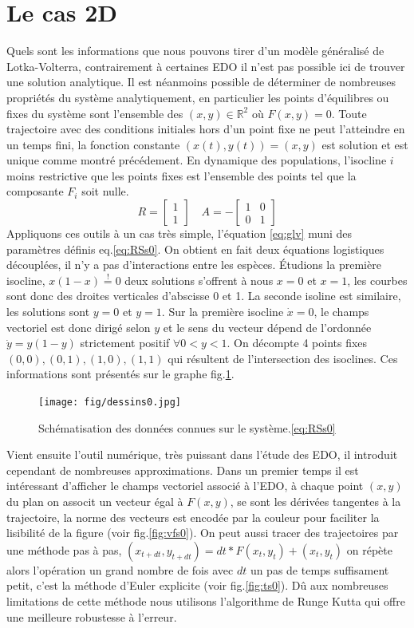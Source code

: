 \documentclass{wsdcr}
\begin{document}
\section{Le cas 2D}
\label{sec:lv2}
Quels sont les informations que nous pouvons tirer d'un modèle généralisé de Lotka-Volterra, contrairement à certaines EDO il n'est pas possible ici de trouver une solution analytique. Il est néanmoins possible de déterminer de nombreuses propriétés du système analytiquement, en particulier les points d'équilibres ou fixes du système sont l'ensemble des $(x,y)\in \mathbb{R}^2$ où $F(x,y)=0$. Toute trajectoire avec des conditions initiales hors d'un point fixe ne peut l'atteindre en un temps fini, la fonction constante $(x(t),y(t))=(x,y)$ est solution et est unique comme montré précédement. En dynamique des populations, l'isocline $i$ moins restrictive que les points fixes est l'ensemble des points tel que la composante $F_i$ soit nulle.
\begin{equation}
R={\begin{bmatrix}1\\1\end{bmatrix}}\quad A =-{\begin{bmatrix}1&0\\0&1\end{bmatrix}}
\label{eq:RSs0}
\end{equation}
Appliquons ces outils à un cas très simple, l'équation \ref{eq:glv} muni des paramètres définis eq.\ref{eq:RSs0}. On obtient en fait deux équations logistiques découplées, il n'y a pas d'interactions entre les espèces. Étudions la première isocline, $x(1-x)\overset{!}{=}0$ deux solutions s'offrent à nous $x=0$ et $x=1$, les courbes sont donc des droites verticales d'abscisse 0 et 1. La seconde isoline est similaire, les solutions sont $y=0$ et $y=1$. Sur la première isocline $\dot{x}=0$, le champs vectoriel est donc dirigé selon $y$ et le sens du vecteur dépend de l'ordonnée $\dot{y}=y(1-y)$  strictement positif $\forall 0<y<1$. On décompte 4 points fixes ${(0,0),(0,1),(1,0),(1,1)}$ qui résultent de l'intersection des isoclines. Ces informations sont présentés sur le graphe fig.\ref{fig:dessinlv2s0}.
\begin{figure}
    \centering
    \texttt{[image: fig/dessins0.jpg]}
    \caption{Schématisation des données connues sur le système.\ref{eq:RSs0}}
    \label{fig:dessinlv2s0}
\end{figure}
Vient ensuite l'outil numérique, très puissant dans l'étude des EDO, il introduit cependant de nombreuses approximations. Dans un premier temps il est intéressant d'afficher le champs vectoriel associé à l'EDO, à chaque point $(x,y)$ du plan on associt un vecteur égal à $F(x,y)$, se sont les dérivées tangentes à la trajectoire, la norme des vecteurs est encodée par la couleur pour faciliter la lisibilité de la figure (voir fig.\ref{fig:vfs0}). On peut aussi tracer des trajectoires par une méthode pas à pas, $(x_{t+dt},y_{t+dt})=dt*F(x_{t},y_{t})+(x_{t},y_{t})$ on répète alors l'opération un grand nombre de fois avec $dt$ un pas de temps suffisament petit, c'est la méthode d'Euler explicite (voir fig.\ref{fig:ts0}). Dû aux nombreuses limitations de cette méthode nous utilisons l'algorithme de Runge Kutta qui offre une meilleure robustesse à l'erreur.
\end{document}

